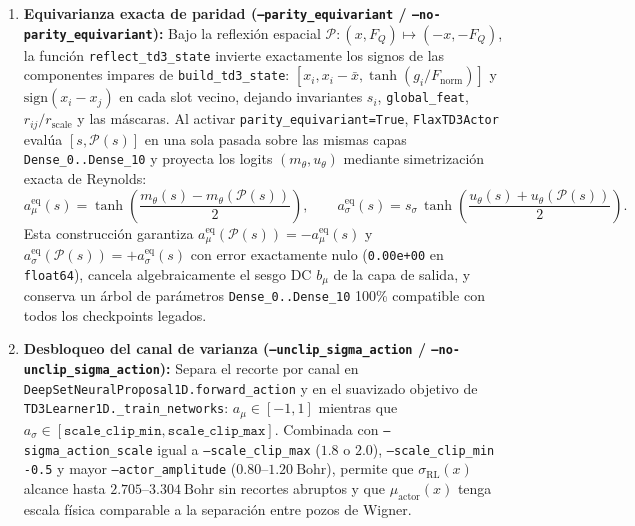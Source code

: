 \documentclass[10pt,a4paper]{article}
\begin{document}
\begin{enumerate}
\item \textbf{Equivarianza exacta de paridad (\texttt{--parity\_equivariant} / \texttt{--no-parity\_equivariant}):} Bajo la reflexión espacial $\mathcal{P}: (x, F_Q) \mapsto (-x, -F_Q)$, la función \texttt{reflect\_td3\_state} invierte exactamente los signos de las componentes impares de \texttt{build\_td3\_state}: $[x_i, x_i-\bar{x}, \tanh(g_i/F_{\mathrm{norm}})]$ y $\mathrm{sign}(x_i - x_j)$ en cada slot vecino, dejando invariantes $s_i$, \texttt{global\_feat}, $r_{ij}/r_{\mathrm{scale}}$ y las máscaras. Al activar \texttt{parity\_equivariant=True}, \texttt{FlaxTD3Actor} evalúa $[s, \mathcal{P}(s)]$ en una sola pasada sobre las mismas capas \texttt{Dense\_0..Dense\_10} y proyecta los logits $(m_\theta, u_\theta)$ mediante simetrización exacta de Reynolds:
\begin{equation}
a_\mu^{\mathrm{eq}}(s) = \tanh\!\left(\frac{m_\theta(s) - m_\theta(\mathcal{P}(s))}{2}\right), \qquad
a_\sigma^{\mathrm{eq}}(s) = s_\sigma\,\tanh\!\left(\frac{u_\theta(s) + u_\theta(\mathcal{P}(s))}{2}\right).
\label{eq:parity_reynolds}
\end{equation}
Esta construcción garantiza $a_\mu^{\mathrm{eq}}(\mathcal{P}(s)) = -a_\mu^{\mathrm{eq}}(s)$ y $a_\sigma^{\mathrm{eq}}(\mathcal{P}(s)) = +a_\sigma^{\mathrm{eq}}(s)$ con error exactamente nulo (\texttt{0.00e+00} en \texttt{float64}), cancela algebraicamente el sesgo DC $b_\mu$ de la capa de salida, y conserva un árbol de parámetros \texttt{Dense\_0..Dense\_10} 100\% compatible con todos los checkpoints legados.

\item \textbf{Desbloqueo del canal de varianza (\texttt{--unclip\_sigma\_action} / \texttt{--no-unclip\_sigma\_action}):} Separa el recorte por canal en \texttt{DeepSetNeuralProposal1D.forward\_action} y en el suavizado objetivo de \texttt{TD3Learner1D.\_train\_networks}: $a_\mu \in [-1, 1]$ mientras que $a_\sigma \in [\texttt{scale\_clip\_min}, \texttt{scale\_clip\_max}]$. Combinada con \texttt{--sigma\_action\_scale} igual a \texttt{--scale\_clip\_max} ($1.8$ o $2.0$), \texttt{--scale\_clip\_min -0.5} y mayor \texttt{--actor\_amplitude} ($0.80\text{--}1.20\ \mathrm{Bohr}$), permite que $\sigma_{\mathrm{RL}}(x)$ alcance hasta $2.705\text{--}3.304\ \mathrm{Bohr}$ sin recortes abruptos y que $\mu_{\mathrm{actor}}(x)$ tenga escala física comparable a la separación entre pozos de Wigner.


\end{enumerate}
\end{document}
